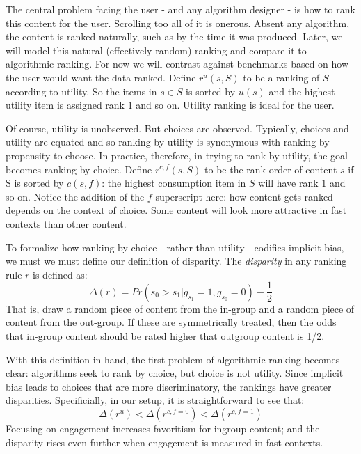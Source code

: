 \documentclass[12pt,letterpaper]{article}
\begin{document}
The central problem facing the user - and any algorithm designer - is how to rank this content for the user. Scrolling too all of it is onerous. Absent any algorithm, the content is ranked naturally, such as by the time it was produced. Later, we will model this natural (effectively random) ranking and compare it to algorithmic ranking.  For now we will contrast against benchmarks based on how the user would want the data ranked. Define $r^u(s,S)$ to be a ranking of $S$ according to utility. So the items in $s \in S$ is sorted by $u(s)$ and the highest utility item is assigned rank $1$ and so on. Utility ranking is ideal for the user. 

Of course, utility is unobserved. But choices are observed.  Typically, choices and utility are equated and so ranking by utility is synonymous with ranking by propensity to choose. In practice, therefore, in trying to rank by utility, the goal becomes ranking by choice. Define $r^{c,f}(s,S)$ to be the rank order of content $s$ if S is sorted by $c(s,f)$: the highest consumption item in $S$ will have rank $1$ and so on.  Notice the addition of the $f$ superscript here: how content gets ranked depends on the context of choice. Some content will look more attractive in fast contexts than other content. 

To formalize how ranking by choice - rather than utility - codifies implicit bias, we must we must define our definition of disparity. The \textit{disparity} in any ranking rule $r$ is defined as: 
$$\Delta(r) = Pr(s_0 > s_1 | g_{s_1}= 1, g_{s_0} = 0) - \frac{1}{2}$$ 
That is, draw a random piece of content from the in-group and a random piece of content from the out-group. If these are symmetrically treated, then the odds that in-group content should be rated higher that outgroup content is 1/2. 

With this definition in hand, the first problem of algorithmic ranking becomes clear: algorithms seek to rank by choice, but choice is not utility. Since implicit bias leads to choices that are more discriminatory, the rankings have greater disparities. Specificially, in our setup, it is straightforward to see that: 
$$\Delta(r^u) < \Delta(r^{c,f=0}) < \Delta(r^{c,f=1}) $$
Focusing on engagement increases favoritism for ingroup content; and the disparity rises even further when engagement is measured in fast contexts.
\end{document}
